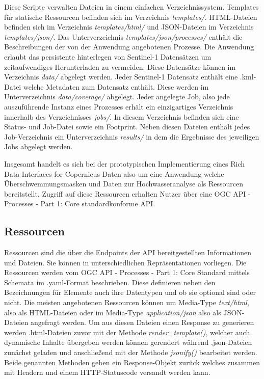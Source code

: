 Diese Scripte verwalten Dateien in einem einfachen Verzeichnissystem. Templates für statische Ressourcen befinden sich im Verzeichnis \textit{templates/}. HTML-Dateien 
befinden sich im Verzeichnis \textit{templates/html/} und JSON-Dateien im Verzeichnis \textit{templates/json/}. Das Unterverzeichnis \textit{templates/json/processes/} enthält die 
Beschreibungen der von der Anwendung angebotenen Prozesse. 
Die Anwendung erlaubt das persistente hinterlegen von Sentinel-1 Datensätzen um zeitaufwendiges Herunterladen zu vermeiden. Diese Datensätze können im Verzeichnis \textit{data/} abgelegt werden. Jeder Sentinel-1 Datensatz enthält eine .kml-Datei welche 
Metadaten zum Datensatz enthält. Diese werden im Unterverzeichnis \textit{data/coverage/} abgelegt. 
Jeder angelegte Job, also jede auszuführende Instanz eines Prozesses erhält ein einzigartiges Verzeichnis innerhalb des Verzeichnisses \textit{jobs/}. In diesem 
Verzeichnis befinden sich eine Status- und Job-Datei sowie ein Footprint. Neben diesen Dateien enthält jedes Job-Verzeichnis ein Unterverzeichnis \textit{results/} in dem
die Ergebnisse des jeweiligen Jobs abgelegt werden.


Insgesamt handelt es sich bei der prototypischen Implementierung eines Rich Data Interfaces for Copernicus-Daten also um eine Anwendung welche Überschwemmungsmasken und Daten zur Hochwasseranalyse als Ressourcen bereitstellt.
Zugriff auf diese Ressourcen erhalten Nutzer über eine OGC API - Processes - Part 1: Core standardkonforme API. 

\subsection{Ressourcen}
Ressourcen sind die über die Endpoints der API bereitgestellten Informationen und Dateien. Sie können in unterschiedlichen Repräsentationen vorliegen. 
Die Ressourcen werden vom OGC API - Processes - Part 1: Core Standard mittels Schemata im .yaml-Format beschrieben. 
Diese definieren neben den Bezeichnungen für Elemente auch ihre Datentypen und ob sie optional sind oder nicht. 
Die meisten angebotenen Ressourcen können um Media-Type \textit{text/html}, also als HTML-Dateien oder im Media-Type \textit{application/json} also als 
JSON-Dateien angefragt werden. Um aus diesen Dateien einen Response zu generieren werden .html-Dateien zuvor mit der Methode \textit{render\_template()}, welcher auch 
dynamische Inhalte übergeben werden können gerendert während .json-Dateien zunächst geladen und anschließend 
mit der Methode \textit{jsonify()} bearbeitet werden. Beide genannten Methoden
geben ein Response-Objekt zurück welches zusammen mit Headern und einem HTTP-Statuscode versandt werden kann. \\

